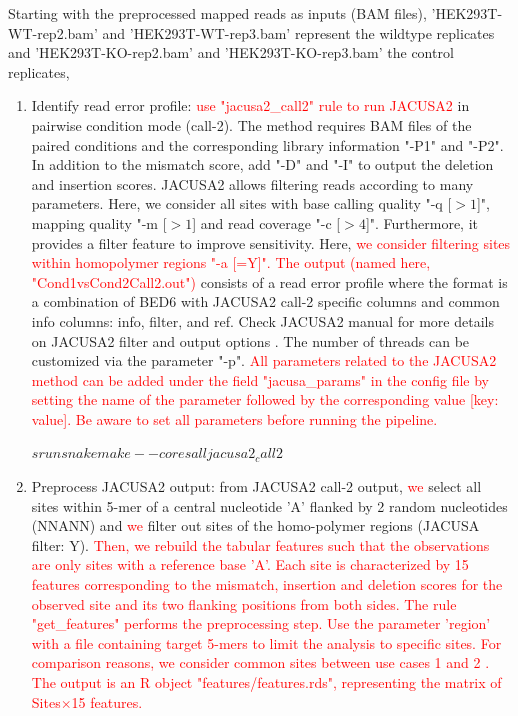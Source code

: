 \documentclass[times, 11pt, a4paper]{article}
\begin{document}
Starting with the preprocessed mapped reads as inputs (BAM files), 'HEK293T-WT-rep2.bam' and 'HEK293T-WT-rep3.bam' represent the wildtype replicates and 'HEK293T-KO-rep2.bam' and  'HEK293T-KO-rep3.bam' the control replicates,
\begin{enumerate} 
	\item Identify read error profile:  \textcolor{red}{use "jacusa2\_call2" rule to run JACUSA2} in pairwise condition mode (call-2). The method requires BAM files of the paired conditions and the corresponding library information "-P1" and "-P2". In addition to the mismatch score, add "-D" and "-I" to output the deletion and insertion scores. JACUSA2 allows filtering reads according to many parameters. Here, we consider all sites with base calling quality "-q [$>1$]", mapping quality "-m [$>1$] and read coverage "-c [$>4$]". Furthermore, it provides a filter feature to improve sensitivity. Here, \textcolor{red}{ we consider filtering sites within homopolymer regions "-a [=Y]". The output (named here, "Cond1vsCond2Call2.out")} consists of a read error profile where the format is a combination of BED6 with JACUSA2 call-2 specific columns and common info columns: info, filter, and ref. Check JACUSA2 manual for more details on JACUSA2 filter and output options \citep{JACUSA2manual}. The number of threads can be customized via the parameter "-p". \textcolor{red}{All parameters related to the JACUSA2 method can be added under the field "jacusa\_params" in the config file by setting the name of the parameter followed by the corresponding value [key: value]. Be aware to set all parameters before running the pipeline. } 
	\begin{spverbatim}
	$ srun snakemake --cores all jacusa2_call2 	$
	\end{spverbatim}
	\item Preprocess JACUSA2 output: from JACUSA2 call-2 output, \textcolor{red}{we} select all sites within 5-mer of a central nucleotide 'A' flanked by 2 random nucleotides (NNANN) and \textcolor{red}{we} filter out sites of the homo-polymer regions (JACUSA filter: Y).
	 \textcolor{red}{Then, we rebuild the tabular features such that the observations are only sites with a reference base 'A'. Each site is characterized by 15 features corresponding to the mismatch, insertion and deletion scores for the observed site and its two flanking positions from both sides. 
	 The rule "get\_features" performs the preprocessing step. Use the parameter 'region' with a file containing target 5-mers to limit the analysis to specific sites. For comparison reasons, we consider common sites between use cases 1 and 2 . The output is an R object "features/features.rds", representing the matrix of Sites$\times$15 features. %
 }


\end{enumerate}
\end{document}
